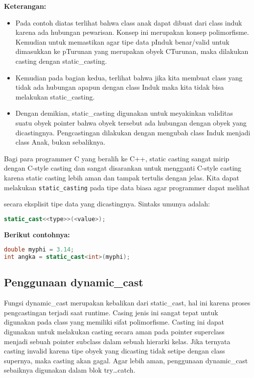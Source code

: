 \textbf{Keterangan:}

\begin{itemize}

\item
  Pada contoh diatas terlihat bahwa class anak dapat dibuat dari class
  induk karena ada hubungan pewarisan. Konsep ini merupakan konsep
  polimorfisme. Kemudian untuk memastikan agar tipe data pInduk
  benar/valid untuk dimasukkan ke pTurunan yang merupakan obyek
  CTurunan, maka dilakukan casting dengan static\_casting.
\item
  Kemudian pada bagian kedua, terlihat bahwa jika kita membuat class
  yang tidak ada hubungan apapun dengan class Induk maka kita tidak bisa
  melakukan static\_casting.
\item
  Dengan demikian, static\_casting digunakan untuk meyakinkan validitas
  suatu obyek pointer bahwa obyek tersebut ada hubungan dengan obyek
  yang dicastingnya. Pengcastingan dilakukan dengan mengubah class Induk
  menjadi class Anak, bukan sebaliknya.
\end{itemize}

Bagi para programmer C yang beralih ke C++, static casting sangat mirip
dengan C-style casting dan sangat disarankan untuk mengganti C-style
casting karena static casting lebih aman dan tampak tertulis dengan
jelas. Kita dapat melakukan \texttt{static\_casting} pada tipe data
biasa agar programmer dapat melihat

secara eksplisit tipe data yang dicastingnya. Sintaks umunya adalah:

\begin{lstlisting}[language=c++, numbers=none]
static_cast<<type>>(<value>);
\end{lstlisting}

\textbf{Berikut contohnya:}

\begin{lstlisting}[language=c++, numbers=none]
double myphi = 3.14;
int angka = static_cast<int>(myphi);
\end{lstlisting}

\subsection{Penggunaan
dynamic\_cast}\label{penggunaan-dynamicux5fcast}

Fungsi dynamic\_cast merupakan kebalikan dari static\_cast, hal ini
karena proses pengcastingan terjadi saat runtime. Casing jenis ini
sangat tepat untuk digunakan pada class yang memiliki sifat
polimorfisme. Casting ini dapat digunakan untuk melakukan casting secara
aman pada pointer superclass menjadi sebuah pointer subclass dalam
sebuah hierarki kelas. Jika ternyata casting invalid karena tipe obyek
yang dicasting tidak setipe dengan class supernya, maka casting akan
gagal. Agar lebih aman, penggunaan dynamic\_cast sebaiknya digunakan
dalam blok try\ldots{}catch.

